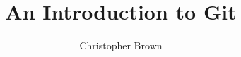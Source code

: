 

\usepackage{amsmath}
\usepackage{siunitx}
\usepackage{texlogos}

\title{An Introduction to Git}
\author{Christopher Brown}
\date{}



\begin{frame}
	\titlepage
\end{frame}


